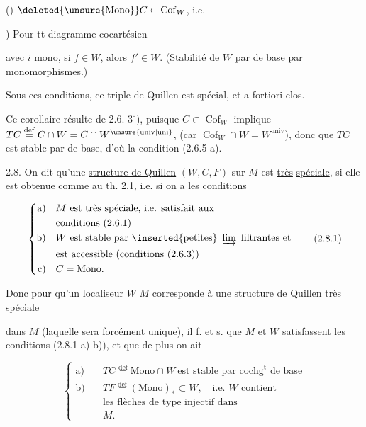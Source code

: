 () $\deleted{\unsure{\mathrm{Mono}}}C\subset\operatorname{Cof}_W$, i.e. 

) Pour tt diagramme cocartésien


avec $i$ mono, si $f\in W$, alors $f'\in W$.
(Stabilité de $W$ par  de base
par monomorphismes.)

Sous ces conditions, ce triple de Quillen est
spécial, et a fortiori clos.

Ce corollaire résulte de 2.6. $3^\circ$), puisque
$C\subset\operatorname{Cof}_W$ implique $TC\overset{\mathrm{def}}{=}C\cap W=C\cap W^{\unsure{\mathrm{univ}|\mathrm{uni}}}$,
 (car $\operatorname{Cof}_W\cap W=W^{\mathrm{univ}}$), donc que
$TC$ est stable par  de base, d'où la
condition (2.6.5 a).

2.8. On dit qu'une \uline{structure de Quillen}
$(W,C,F)$ sur $M$ est \uline{très} \uline{spéciale}, si elle
est obtenue comme au th. 2.1, i.e.
si on a les conditions

\[
\left\{\begin{aligned}
\text{a)}\quad & M\ \text{est très spéciale, i.e. satisfait aux}\\
 &\text{conditions (2.6.1)}\\
\text{b)}\quad & W\ \text{est stable par }\inserted{\text{petites}}\ \varinjlim\ \text{filtrantes et}\\
 &\text{est accessible (conditions (2.6.3))}\\
\text{c)}\quad & C=\mathrm{Mono}.
\end{aligned}\right.\tag*{(2.8.1)}
\]

Donc pour qu'un localiseur $W$  $M$ corresponde
à une structure de Quillen  très spéciale

dans $M$ (laquelle sera forcément unique), il f. et
s. que $M$ et $W$ satisfassent les conditions
(2.8.1 a) b)), et que de plus on ait

\[
\left\{\begin{aligned}
\text{a)}\quad &TC\overset{\mathrm{def}}{=}\mathrm{Mono}\cap W\ \text{est stable par cochg}^{\mathrm t}\text{ de base}\\
\text{b)}\quad &TF\overset{\mathrm{def}}{=}(\mathrm{Mono})_*\subset W,\quad\text{i.e. }W\text{ contient}\\
 &\text{les flèches de type injectif dans}\\
 &M.
\end{aligned}\right.\tag*{(2.8.2)}
\]


